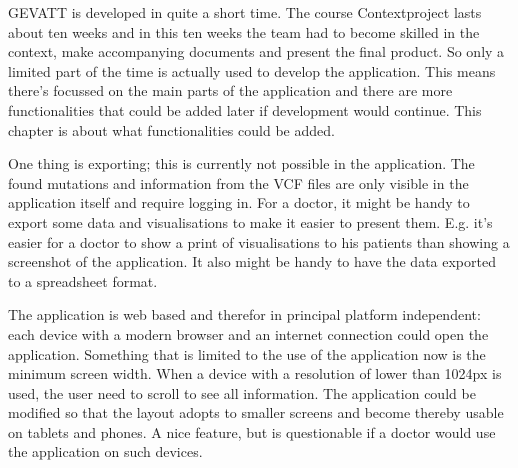 GEVATT is developed in quite a short time. The course Contextproject lasts about ten weeks and in this ten weeks the team had to become skilled in the context, make accompanying documents	 and present the final product. So only a limited part of the time is actually used to develop the application. This means there's focussed on the main parts of the application and there are more functionalities that could be added later if development would continue. This chapter is about what functionalities  could be added.

One thing is exporting; this is currently not possible in the application. The found mutations and information from the VCF files are only visible in the application itself and require logging in. For a doctor, it might be handy to export some data and visualisations to make it easier to present them. E.g. it's easier for a doctor to show a print of visualisations to his patients than showing a screenshot of the application. It also might be handy to have the data exported to a spreadsheet format.

The application is web based and therefor in principal platform independent: each device with a modern browser and an internet connection could open the application. Something that is limited to the use of the application now is the minimum screen width. When a device with a resolution of lower than 1024px is used, the user need to scroll to see all information. The application could be modified so that the layout adopts to smaller screens and become thereby usable on tablets and phones. A nice feature, but is questionable if a doctor would use the application on such devices.